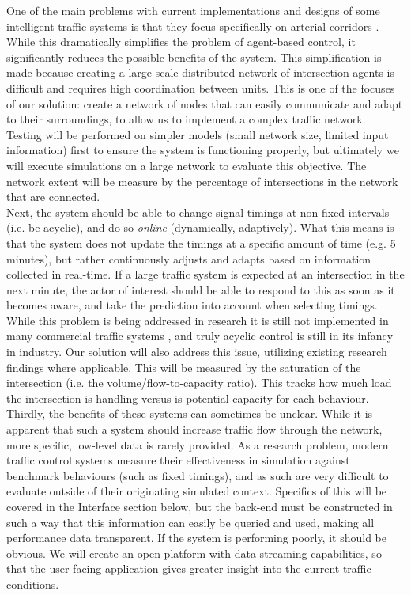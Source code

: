 \documentclass{article}
\begin{document}
One of the main problems with current implementations and designs of some intelligent traffic systems is that they focus specifically on arterial corridors \cite{ACS:2008}.
While this dramatically simplifies the problem of agent-based control, it significantly reduces the possible benefits of the system.
This simplification is made because creating a large-scale distributed network of intersection agents is difficult and requires high coordination between units.
This is one of the focuses of our solution: create a network of nodes that can easily communicate and adapt to their surroundings, to allow us to implement a complex traffic network.
Testing will be performed on simpler models (small network size, limited input information) first to ensure the system is functioning properly, but ultimately we will execute simulations on a large network to evaluate this objective.
The network extent will be measure by the percentage of intersections in the network that are connected.\\

Next, the system should be able to change signal timings at non-fixed intervals (i.e. be acyclic), and do so \emph{online} (dynamically, adaptively).
What this means is that the system does not update the timings at a specific amount of time (e.g. 5 minutes), but rather continuously adjusts and adapts based on information collected in real-time.
If a large traffic system is expected at an intersection in the next minute, the actor of interest should be able to respond to this as soon as it becomes aware, and take the prediction into account when selecting timings.
While this problem is being addressed in research it is still not implemented in many commercial traffic systems \cite{155481, 5349439, ACS:2008}, and truly acyclic control is still in its infancy in industry.
Our solution will also address this issue, utilizing existing research findings where applicable.
This will be measured by the saturation of the intersection (i.e. the volume/flow-to-capacity ratio). 
This tracks how much load the intersection is handling versus is potential capacity for each behaviour.\\

Thirdly, the benefits of these systems can sometimes be unclear.
While it is apparent that such a system should increase traffic flow through the network, more specific, low-level data is rarely provided.
As a research problem, modern traffic control systems measure their effectiveness in simulation against benchmark behaviours (such as fixed timings), and as such are very difficult to evaluate outside of their originating simulated context.
Specifics of this will be covered in the Interface section below, but the back-end must be constructed in such a way that this information can easily be queried and used, making all performance data transparent.
If the system is performing poorly, it should be obvious.
We will create an open platform with data streaming capabilities, so that the user-facing application gives greater insight into the current traffic conditions.
\end{document}

